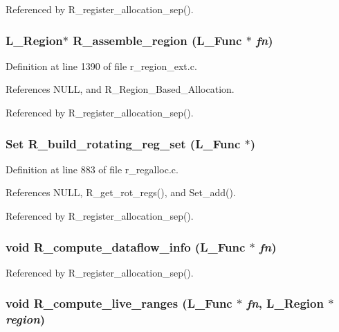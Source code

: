Referenced by R\_\-register\_\-allocation\_\-sep().
\subsubsection{\setlength{\rightskip}{0pt plus 5cm}L\_\-Region$\ast$ R\_\-assemble\_\-region (L\_\-Func $\ast$ {\em fn})}\label{r__regproto_8h_d200cb12c11b8a014597a62f2d5c42fc}




Definition at line 1390 of file r\_\-region\_\-ext.c.

References NULL, and R\_\-Region\_\-Based\_\-Allocation.

Referenced by R\_\-register\_\-allocation\_\-sep().
\subsubsection{\setlength{\rightskip}{0pt plus 5cm}\bf{Set} R\_\-build\_\-rotating\_\-reg\_\-set (L\_\-Func $\ast$)}\label{r__regproto_8h_2f3ccfb38a3beaf41077e62b8b2a1a42}




Definition at line 883 of file r\_\-regalloc.c.

References NULL, R\_\-get\_\-rot\_\-regs(), and Set\_\-add().

Referenced by R\_\-register\_\-allocation\_\-sep().
\subsubsection{\setlength{\rightskip}{0pt plus 5cm}void R\_\-compute\_\-dataflow\_\-info (L\_\-Func $\ast$ {\em fn})}\label{r__regproto_8h_3e48210c4bd26693f0d167d7df93237f}




Referenced by R\_\-register\_\-allocation\_\-sep().
\subsubsection{\setlength{\rightskip}{0pt plus 5cm}void R\_\-compute\_\-live\_\-ranges (L\_\-Func $\ast$ {\em fn}, L\_\-Region $\ast$ {\em region})}\label{r__regproto_8h_debe6c3ffc8043290af2285e0a521915}




